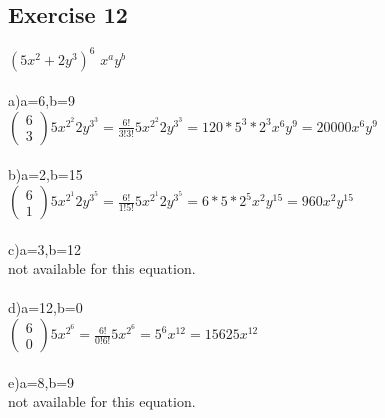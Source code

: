 \documentclass[12pt]{article}
\begin{document}
\subsection*{Exercise 12}
$(5x^2+2y^3)^6$  $x^ay^b$\\\\
a)a=6,b=9\\
$(\substack{6\\3})5x^{2^2}2y^{3^3}=\frac{6!}{3!3!}5x^{2^2}2y^{3^3}=120*5^3*2^3x^6y^9=20000x^6y^9$\\
\\
b)a=2,b=15\\
$(\substack{6\\1})5x^{2^1}2y^{3^5}=\frac{6!}{1!5!}5x^{2^1}2y^{3^5}=6*5*2^5x^2y^{15}=960x^2y^{15}$\\
\\
c)a=3,b=12\\
not available for this equation.\\
\\
d)a=12,b=0\\
$(\substack{6\\0})5x^{2^6}=\frac{6!}{0!6!}5x^{2^6}=5^6x^{12}=15625x^{12}$\\
\\
e)a=8,b=9\\
not available for this equation.\\
\end{document}
